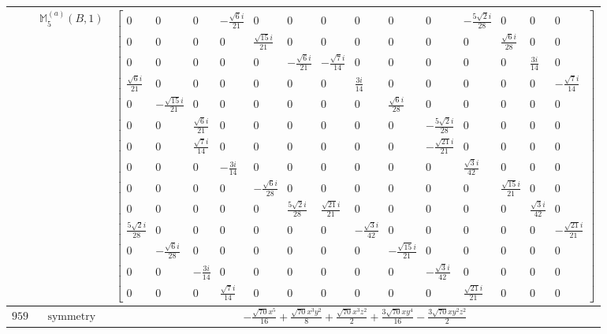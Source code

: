 \documentclass[fleqn,8pt,landscape]{jsarticle}
\begin{document}
\begin{longtable}{ccc}
$  $ & $ \mathbb{M}_{5}^{(a)}(B,1) $ & $ \begin{bmatrix} 0 & 0 & 0 & - \frac{\sqrt{6} i}{21} & 0 & 0 & 0 & 0 & 0 & 0 & - \frac{5 \sqrt{2} i}{28} & 0 & 0 & 0 \\ 0 & 0 & 0 & 0 & \frac{\sqrt{15} i}{21} & 0 & 0 & 0 & 0 & 0 & 0 & \frac{\sqrt{6} i}{28} & 0 & 0 \\ 0 & 0 & 0 & 0 & 0 & - \frac{\sqrt{6} i}{21} & - \frac{\sqrt{7} i}{14} & 0 & 0 & 0 & 0 & 0 & \frac{3 i}{14} & 0 \\ \frac{\sqrt{6} i}{21} & 0 & 0 & 0 & 0 & 0 & 0 & \frac{3 i}{14} & 0 & 0 & 0 & 0 & 0 & - \frac{\sqrt{7} i}{14} \\ 0 & - \frac{\sqrt{15} i}{21} & 0 & 0 & 0 & 0 & 0 & 0 & \frac{\sqrt{6} i}{28} & 0 & 0 & 0 & 0 & 0 \\ 0 & 0 & \frac{\sqrt{6} i}{21} & 0 & 0 & 0 & 0 & 0 & 0 & - \frac{5 \sqrt{2} i}{28} & 0 & 0 & 0 & 0 \\ 0 & 0 & \frac{\sqrt{7} i}{14} & 0 & 0 & 0 & 0 & 0 & 0 & - \frac{\sqrt{21} i}{21} & 0 & 0 & 0 & 0 \\ 0 & 0 & 0 & - \frac{3 i}{14} & 0 & 0 & 0 & 0 & 0 & 0 & \frac{\sqrt{3} i}{42} & 0 & 0 & 0 \\ 0 & 0 & 0 & 0 & - \frac{\sqrt{6} i}{28} & 0 & 0 & 0 & 0 & 0 & 0 & \frac{\sqrt{15} i}{21} & 0 & 0 \\ 0 & 0 & 0 & 0 & 0 & \frac{5 \sqrt{2} i}{28} & \frac{\sqrt{21} i}{21} & 0 & 0 & 0 & 0 & 0 & \frac{\sqrt{3} i}{42} & 0 \\ \frac{5 \sqrt{2} i}{28} & 0 & 0 & 0 & 0 & 0 & 0 & - \frac{\sqrt{3} i}{42} & 0 & 0 & 0 & 0 & 0 & - \frac{\sqrt{21} i}{21} \\ 0 & - \frac{\sqrt{6} i}{28} & 0 & 0 & 0 & 0 & 0 & 0 & - \frac{\sqrt{15} i}{21} & 0 & 0 & 0 & 0 & 0 \\ 0 & 0 & - \frac{3 i}{14} & 0 & 0 & 0 & 0 & 0 & 0 & - \frac{\sqrt{3} i}{42} & 0 & 0 & 0 & 0 \\ 0 & 0 & 0 & \frac{\sqrt{7} i}{14} & 0 & 0 & 0 & 0 & 0 & 0 & \frac{\sqrt{21} i}{21} & 0 & 0 & 0 \end{bmatrix} $ \\ \hline
$ 959 $ & $ \text{symmetry} $ & $ - \frac{\sqrt{70} x^{5}}{16} + \frac{\sqrt{70} x^{3} y^{2}}{8} + \frac{\sqrt{70} x^{3} z^{2}}{2} + \frac{3 \sqrt{70} x y^{4}}{16} - \frac{3 \sqrt{70} x y^{2} z^{2}}{2} $ \\

\end{longtable}
\end{document}
